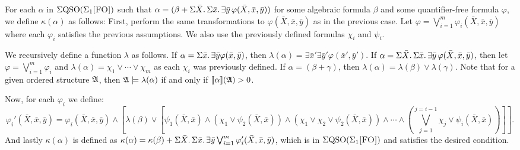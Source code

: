 \vspace{1em}

For each $\alpha$ in $\Sigma{\rm QSO}(\Sigma_{1}\textsc{[FO]})$ such that $\alpha = (\beta + \Sigma{\bar{X}}.\,\Sigma{\bar{x}}.\,\exists\bar{y}\,\varphi(\bar{X},\bar{x},\bar{y}))$ for some algebraic formula $\beta$ and some quantifier-free formula $\varphi$, we define $\kappa(\alpha)$ as follows: First, perform the same transformations to $\varphi(\bar{X},\bar{x},\bar{y})$ as in the previous case. Let $\varphi = \bigvee_{i = 1}^m\varphi_i(\bar{X},\bar{x},\bar{y})$ where each $\varphi_i$ satisfies the previous assumptions. We also use the previously defined formulas $\chi_i$ and $\psi_i$. 

We recursively define a function $\lambda$ as follows. If $\alpha = \Sigma{\bar{x}}.\,\exists\bar{y}\varphi(\bar{x},\bar{y})$, then $\lambda(\alpha) = \exists\bar{x}'\exists\bar{y}'\varphi(\bar{x}',\bar{y}')$. If $\alpha = \Sigma{\bar{X}}.\,\Sigma{\bar{x}}.\,\exists\bar{y}\,\varphi(\bar{X},\bar{x},\bar{y})$, then let $\varphi = \bigvee_{i = 1}^{m}\varphi_i$ and $\lambda(\alpha) = \chi_1\vee\cdots\vee\chi_m$ as each $\chi_i$ was previously defined. If $\alpha = (\beta + \gamma)$, then $\lambda(\alpha) = \lambda(\beta) \vee \lambda(\gamma)$. Note that for a given ordered structure $\mathfrak{A}$, then $\mathfrak{A}\models\lambda(\alpha)$ if and only if ${\llbracket{}{\alpha}\rrbracket}(\mathfrak{A}) > 0$.

Now, for each $\varphi_i$ we define:
$$
\varphi_i'(\bar{X},\bar{x},\bar{y}) = \varphi_i(\bar{X},\bar{x},\bar{y})\wedge[\lambda(\beta)\vee[\psi_1(\bar{X},\bar{x})\wedge(\chi_1\vee\psi_2(\bar{X},\bar{x}))\wedge(\chi_1\vee\chi_2\vee\psi_2(\bar{X},\bar{x}))\wedge\cdots\wedge(
\bigvee_{j = 1}^{j = i-1}\chi_j\vee\psi_i(\bar{X},\bar{x}))]].
$$
And lastly $\kappa(\alpha)$ is defined as $\kappa(\alpha) = \kappa(\beta) + \Sigma{\bar{X}}.\,\Sigma{\bar{x}}.\,\exists\bar{y}\bigvee_{i = 1}^m\varphi_i'(\bar{X},\bar{x},\bar{y})$, which is in $\Sigma{\rm QSO}(\Sigma_{1}\textsc{[FO]})$ and satisfies the desired condition.

